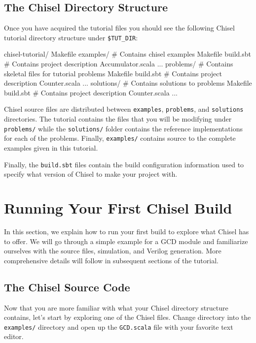\subsection{The Chisel Directory Structure}

Once you have acquired the tutorial files you should see the following Chisel tutorial directory structure under \verb+$TUT_DIR+:

\begin{bash}
chisel-tutorial/  
  Makefile
  examples/   # Contains chisel examples
    Makefile  
    build.sbt # Contains project description
    Accumulator.scala ...
  problems/   # Contains skeletal files for tutorial problems
    Makefile
    build.sbt # Contains project description
    Counter.scala ...
  solutions/  # Contains solutions to problems
    Makefile
    build.sbt # Contains project description
    Counter.scala ...
\end{bash}

Chisel source files are distributed between \verb+examples+, \verb+problems+, and \verb+solutions+ directories.
The tutorial contains the files that you will be modifying under \verb+problems/+ while the \verb+solutions/+ folder contains the reference implementations for each of the problems.  Finally, \verb+examples/+ contains source to the complete examples given in this tutorial.

Finally, the \verb+build.sbt+ files contain the build configuration information used to specify what version of Chisel to make your project with.

\section{Running Your First Chisel Build}

In this section, we explain how to run your first build to explore what Chisel has to offer. We will go through a simple example for a GCD module and familiarize ourselves with the source files, simulation, and Verilog generation. More comprehensive details will follow in subsequent sections of the tutorial.

\subsection{The Chisel Source Code}

Now that you are more familiar with what your Chisel directory structure contains, let's start by exploring one of the Chisel files. Change directory into the \verb+examples/+ directory and open up the \verb+GCD.scala+ file with your favorite text editor. 

